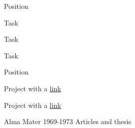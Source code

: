 \documentclass[12pt,a4paper]{awesome-cv}
\begin{document}
\makecvheader
\makecvfooter{\today\\~}{}{\thepage\\~}


\begin{cventries}


\cvsubentry
{Position}
{}
{\begin{cvitems}
\item Task
\item Task
\item Task
\end{cvitems}}


\cvsubentry
{Position}
{}
{\begin{cvitems}
\item Project with a \href{a}{link}
\item Project with a \href{a}{link}
\end{cvitems}}

\end{cventries}


\begin{cventries}
\cventry
{Alma Mater}
{1969-1973}
{}
{}
{Articles and thesis}

\end{cventries}
\end{document}
